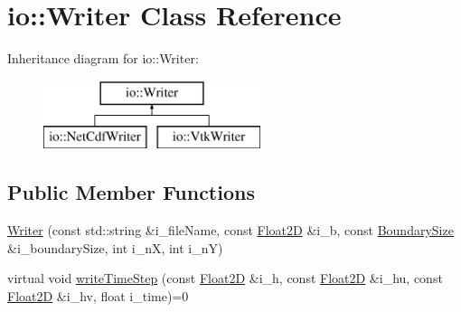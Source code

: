 \hypertarget{classio_1_1Writer}{\section{io\-:\-:Writer Class Reference}
\label{classio_1_1Writer}
}
Inheritance diagram for io\-:\-:Writer\-:\begin{figure}[H]
\begin{center}
\leavevmode
\includegraphics[height=2.000000cm]{classio_1_1Writer}
\end{center}
\end{figure}
\subsection*{Public Member Functions}
\begin{DoxyCompactItemize}
\item 
\hyperlink{classio_1_1Writer_a6fe95f4a66e8b8ee1c9a52196ff3433f}{Writer} (const std\-::string \&i\-\_\-file\-Name, const \hyperlink{classFloat2D}{Float2\-D} \&i\-\_\-b, const \hyperlink{structio_1_1BoundarySize}{Boundary\-Size} \&i\-\_\-boundary\-Size, int i\-\_\-n\-X, int i\-\_\-n\-Y)
\item 
virtual void \hyperlink{classio_1_1Writer_a9ac05caa91aca4e79094d6718a2da16c}{write\-Time\-Step} (const \hyperlink{classFloat2D}{Float2\-D} \&i\-\_\-h, const \hyperlink{classFloat2D}{Float2\-D} \&i\-\_\-hu, const \hyperlink{classFloat2D}{Float2\-D} \&i\-\_\-hv, float i\-\_\-time)=0
\end{DoxyCompactItemize}

